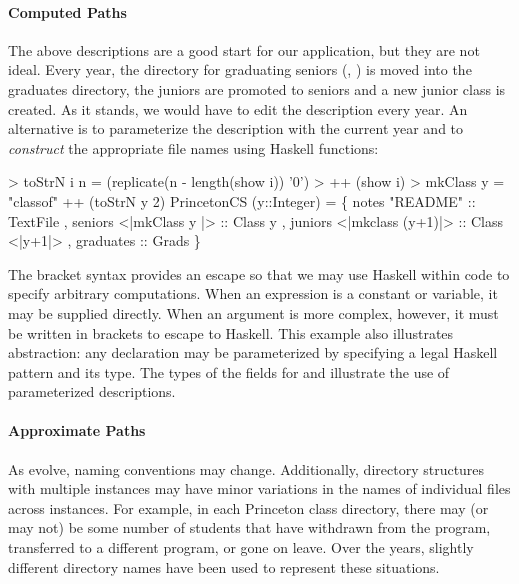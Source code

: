 \paragraph*{Computed Paths}
\label{sec:computed-paths}

The above descriptions are a good start for our application, but they are
not ideal.  Every year, the directory for graduating seniors 
(\ie{}, ) is moved into the graduates directory,
the juniors are promoted to seniors and a new junior class is created.
As it stands, we would have to edit the description every year.
An alternative is to parameterize the description with the current year and
to \textit{construct} the appropriate file names using Haskell functions:
\begin{code}
> toStrN i n = (replicate(n - length(show i)) '0') 
>              ++ (show i)
> mkClass y = "classof" ++ (toStrN y 2)
\mbox{}
 PrincetonCS (y::Integer) = 
  \{ notes    "README" :: TextFile
  , seniors  <|mkClass y    |> :: Class y
  , juniors  <|mkclass (y+1)|> :: Class <|y+1|>
  , graduates :: Grads \}
\end{code}
The bracket syntax  provides an escape so that we may use
Haskell within \forest{} code to specify arbitrary computations.  
When an expression is a constant or variable,
it may be supplied directly.  When an argument is more complex,
however, it must be written in brackets to escape to Haskell.
This example also
illustrates abstraction: any \forest{} declaration may be
parameterized by specifying a legal Haskell pattern and
its type.  The types of the fields for  and 
illustrate the use of parameterized descriptions.

\paragraph*{Approximate Paths}
As \filestores{} evolve, naming conventions may change.
Additionally, directory structures with multiple instances may have
minor variations in the names of individual files across instances.  
For example, in each Princeton class directory, there may
(or may not) be some number of students that have withdrawn from the
program, transferred to a different program, or gone on
leave.  Over the years, slightly different directory names
have been used to represent these situations.  

